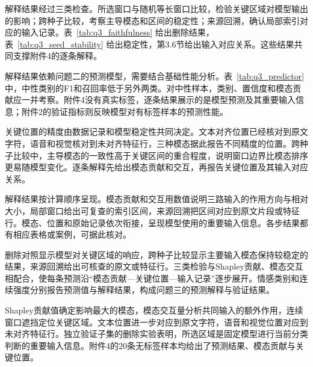 解释结果经过三类检查。所选窗口与随机等长窗口比较，检验关键区域对模型输出的影响；跨种子比较，考察主导模态和区间的稳定性；来源回溯，确认局部索引对应的输入记录。表~\ref{tab:q3_faithfulness} 给出删除结果，表~\ref{tab:q3_seed_stability} 给出稳定性，第3.6节给出输入对应关系。这些结果共同支撑附件4的逐条解释。

解释结果依赖问题二的预测模型，需要结合基础性能分析。表~\ref{tab:q3_predictor} 中，中性类别的F1和召回率低于另外两类。对中性样本，类别、置信度和模态贡献应一并考察。附件4没有真实标签，逐条结果展示的是模型预测及其重要输入信息；附件2的验证指标则反映模型对有标签样本的预测性能。

关键位置的精度由数据记录和模型稳定性共同决定。文本对齐位置已经核对到原文字符，语音和视觉核对到未对齐特征行，三种模态据此报告不同精度的位置。跨种子比较中，主导模态的一致性高于关键区间的重合程度，说明窗口边界比模态排序更易随模型变化。逐条解释先给出模态贡献和交互，再报告关键位置及其输入对应关系。

解释结果按计算顺序呈现。模态贡献和交互用数值说明三路输入的作用方向与相对大小，局部窗口给出可复查的索引区间，来源回溯把区间对应到原文片段或特征行。模态、位置和原始记录依次衔接，呈现模型使用的重要输入信息。各步结果都有相应表格或案例，可据此核对。

删除对照显示模型对关键区域的响应，跨种子比较显示主要输入模态保持较稳定的结果，来源回溯给出可核查的原文或特征行。三类检验与Shapley贡献、模态交互相配合，使每条预测沿“模态贡献—关键位置—输入记录”逐步展开。情感类别和连续强度分别报告预测值与解释结果，构成问题三的预测解释与验证结果。

Shapley贡献值确定影响最大的模态，模态交互量分析共同输入的额外作用，连续窗口遮挡定位关键区域。文本位置进一步对应到原文字符，语音和视觉位置对应到未对齐特征行。独立验证子集的删除实验表明，所选区域是固定模型进行当前分类判断的重要输入信息。附件4的20条无标签样本均给出了预测结果、模态贡献与关键位置。
\FloatBarrier
